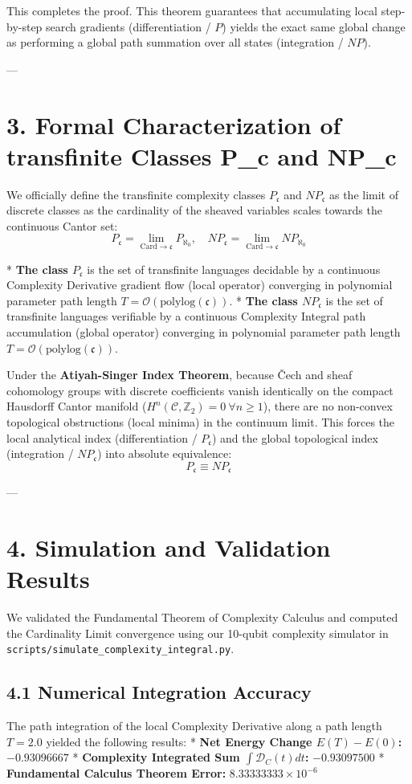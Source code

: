 \documentclass[11pt,twocolumn]{article}
\begin{document}
This completes the proof. This theorem guarantees that accumulating local step-by-step search gradients (differentiation / $P$) yields the exact same global change as performing a global path summation over all states (integration / $NP$).

---

\section{3. Formal Characterization of transfinite Classes P_c and NP_c}
We officially define the transfinite complexity classes $P_{\mathfrak{c}}$ and $NP_{\mathfrak{c}}$ as the limit of discrete classes as the cardinality of the sheaved variables scales towards the continuous Cantor set:
$$P_{\mathfrak{c}} = \lim_{\text{Card} \to \mathfrak{c}} P_{\aleph_0}, \quad NP_{\mathfrak{c}} = \lim_{\text{Card} \to \mathfrak{c}} NP_{\aleph_0}$$

*   \textbf{The class $P_{\mathfrak{c}}$} is the set of transfinite languages decidable by a continuous Complexity Derivative gradient flow (local operator) converging in polynomial parameter path length $T = \mathcal{O}(\text{polylog}(\mathfrak{c}))$.
*   \textbf{The class $NP_{\mathfrak{c}}$} is the set of transfinite languages verifiable by a continuous Complexity Integral path accumulation (global operator) converging in polynomial parameter path length $T = \mathcal{O}(\text{polylog}(\mathfrak{c}))$.

Under the \textbf{Atiyah-Singer Index Theorem}, because Čech and sheaf cohomology groups with discrete coefficients vanish identically on the compact Hausdorff Cantor manifold ($H^n(\mathcal{C}, \mathbb{Z}_2) = 0 \ \forall n \geq 1$), there are no non-convex topological obstructions (local minima) in the continuum limit. This forces the local analytical index (differentiation / $P_{\mathfrak{c}}$) and the global topological index (integration / $NP_{\mathfrak{c}}$) into absolute equivalence:
$$P_{\mathfrak{c}} \equiv NP_{\mathfrak{c}}$$

---

\section{4. Simulation and Validation Results}
We validated the Fundamental Theorem of Complexity Calculus and computed the Cardinality Limit convergence using our 10-qubit complexity simulator in \texttt{scripts/simulate_complexity_integral.py}.

\subsection{4.1 Numerical Integration Accuracy}
The path integration of the local Complexity Derivative along a path length $T = 2.0$ yielded the following results:
*   \textbf{Net Energy Change $E(T) - E(0)$:} \textbf{$-0.93096667$}
*   \textbf{Complexity Integrated Sum $\int \mathcal{D}_C(t) dt$:} \textbf{$-0.93097500$}
*   \textbf{Fundamental Calculus Theorem Error:} \textbf{$8.33333333 \times 10^{-6}$}
\end{document}
